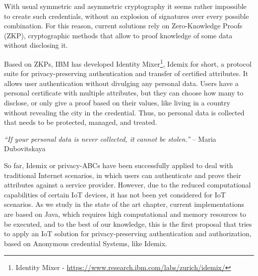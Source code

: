 With usual symmetric and asymmetric cryptography it seems rather impossible to create such credentials, without an explosion of signatures over every possible combination. For this reason, current solutions rely on  Zero-Knowledge Proofs (ZKP), cryptographic methods that allow to proof knowledge of some data without disclosing it.

Based on ZKPs, IBM has developed Identity Mixer\footnote{Identity Mixer - \url{https://www.research.ibm.com/labs/zurich/idemix/}}, Idemix for short, a protocol suite for privacy-preserving authentication and transfer of certified attributes. It allows user authentication without divulging any personal data. Users have a personal certificate with multiple attributes, but they can choose how many to disclose, or only give a proof based on their values, like living in a country without revealing the city in the credential. Thus, no personal data is collected that needs to be protected, managed, and treated.

\begin{center}
	\textit{``If your personal data is never collected, it cannot be stolen.''} -- Maria Dubovitskaya
\end{center}

So far, Idemix or privacy-ABCs have been successfully applied to deal with traditional Internet scenarios, in which users can authenticate and prove their attributes against a service provider. However, due to the reduced computational capabilities of certain IoT devices, it has not been yet considered for IoT scenarios. As we study in the state of the art chapter, current implementations are based on Java, which requires high computational and memory resources to be executed, and to the best of our knowledge, this is the first proposal that tries to apply an IoT solution for privacy-preserving authentication and authorization, based on Anonymous credential Systems, like Idemix.




